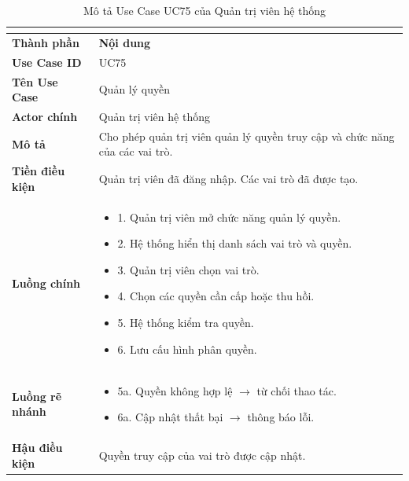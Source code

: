 \begin{longtable}{|C{3cm}|L{11cm}|}
\caption{Mô tả Use Case UC75 của Quản trị viên hệ thống}\\
\label{tab:mo-ta-uc75-quan-tri-vien}\\
\hline
\textbf{Thành phần} & \textbf{Nội dung} \\
\hline
\textbf{Use Case ID} & UC75 \\
\hline
\textbf{Tên Use Case} & Quản lý quyền \\
\hline
\textbf{Actor chính} & Quản trị viên hệ thống \\
\hline
\textbf{Mô tả} &
Cho phép quản trị viên quản lý quyền truy cập và chức năng của các vai trò.
\\
\hline
\textbf{Tiền điều kiện} &
Quản trị viên đã đăng nhập. Các vai trò đã được tạo.
\\
\hline
\textbf{Luồng chính} &
\begin{itemize}[leftmargin=*,topsep=2pt,itemsep=2pt]
    \item 1. Quản trị viên mở chức năng quản lý quyền.
    \item 2. Hệ thống hiển thị danh sách vai trò và quyền.
    \item 3. Quản trị viên chọn vai trò.
    \item 4. Chọn các quyền cần cấp hoặc thu hồi.
    \item 5. Hệ thống kiểm tra quyền.
    \item 6. Lưu cấu hình phân quyền.
\end{itemize}
\\
\hline
\textbf{Luồng rẽ nhánh} &
\begin{itemize}[leftmargin=*,topsep=2pt,itemsep=2pt]
    \item 5a. Quyền không hợp lệ $\rightarrow$ từ chối thao tác.
    \item 6a. Cập nhật thất bại $\rightarrow$ thông báo lỗi.
\end{itemize}
\\
\hline
\textbf{Hậu điều kiện} &
Quyền truy cập của vai trò được cập nhật.
\\
\hline
\end{longtable}


